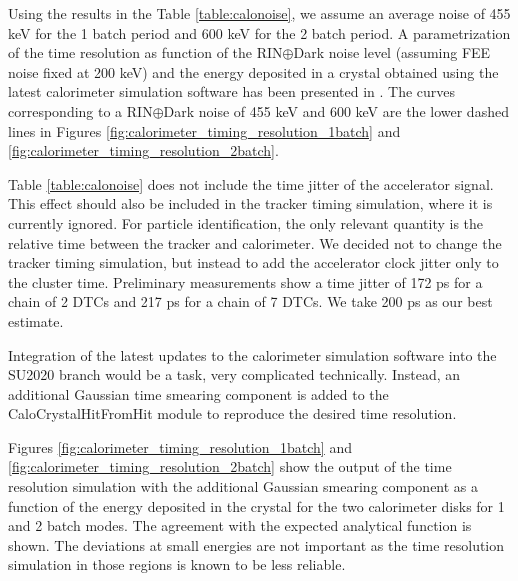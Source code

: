 Using the results in the Table \ref{table:calonoise}, we assume an average noise of 455 keV
for the 1 batch period and 600 keV for the 2 batch period. 
A parametrization of the time resolution as function of the RIN$\oplus$Dark noise level (assuming FEE noise fixed at 200 keV) and the energy deposited
in a crystal obtained using the latest calorimeter simulation software has been presented in  \cite{MU2E_36225_CALO_TIME_RES}.
The curves corresponding to a RIN$\oplus$Dark noise of 455 keV and 600 keV are the lower dashed
lines in Figures \ref{fig:calorimeter_timing_resolution_1batch} and  \ref{fig:calorimeter_timing_resolution_2batch}.

Table \ref{table:calonoise} does not include the time jitter of the accelerator signal.
This effect should also be included in the tracker timing simulation, where it is currently
ignored. For particle identification, the only relevant quantity is the relative time
between the tracker and calorimeter. 
We decided not to change the tracker timing simulation, but instead to add the accelerator
clock jitter only to the cluster time.
Preliminary measurements \cite{MU2E_35392_TIME_JITTER} show a time jitter of 172 ps
for a chain of 2 DTCs and 217 ps for a chain of 7 DTCs. We take 200 ps as our best estimate.

Integration of the latest updates to the calorimeter simulation software into the SU2020 branch
would be a task, very complicated technically. Instead, an additional Gaussian time smearing
component is added to the  CaloCrystalHitFromHit module to reproduce the desired time resolution. 

Figures \ref{fig:calorimeter_timing_resolution_1batch} and  \ref{fig:calorimeter_timing_resolution_2batch} show the output of the time resolution
simulation with the additional Gaussian smearing component as a function of the energy deposited
in the crystal for the two calorimeter disks for 1 and 2 batch modes.
The agreement with the expected analytical function is shown. 
The deviations at small energies are not important as the time resolution simulation
in those regions is known to be less reliable.

